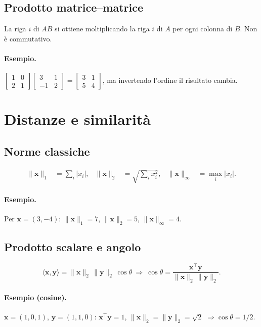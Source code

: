 \subsection{Prodotto matrice–matrice}
La riga \(i\) di \(AB\) si ottiene moltiplicando la riga \(i\) di \(A\) per ogni colonna di \(B\). Non è commutativo.
\paragraph{Esempio.} \(\begin{bmatrix}1&0\\2&1\end{bmatrix}\begin{bmatrix}3&1\\-1&2\end{bmatrix}=\begin{bmatrix}3&1\\5&4\end{bmatrix}\), ma invertendo l'ordine il risultato cambia.

\section{Distanze e similarità}\label{sec:norme}
\subsection{Norme classiche}
\begin{align}
\|\mathbf{x}\|_1&=\sum_i |x_i|, & \|\mathbf{x}\|_2&=\sqrt{\sum_i x_i^2}, & \|\mathbf{x}\|_\infty&=\max_i |x_i|.\label{eq:norme}
\end{align}
\paragraph{Esempio.} Per \(\mathbf{x}=(3,-4)\): \(\|\mathbf{x}\|_1=7\), \(\|\mathbf{x}\|_2=5\), \(\|\mathbf{x}\|_\infty=4\).
\subsection{Prodotto scalare e angolo}
\[\langle\mathbf{x},\mathbf{y}\rangle=\|\mathbf{x}\|_2\,\|\mathbf{y}\|_2\,\cos\theta\ \Rightarrow\ \cos\theta=\dfrac{\mathbf{x}^\top\mathbf{y}}{\|\mathbf{x}\|_2\,\|\mathbf{y}\|_2}.\]
\paragraph{Esempio (cosine).} \(\mathbf{x}=(1,0,1)\), \(\mathbf{y}=(1,1,0)\): \(\mathbf{x}^\top\mathbf{y}=1\), \(\|\mathbf{x}\|_2=\|\mathbf{y}\|_2=\sqrt{2}\) \(\Rightarrow\cos\theta=1/2\).
